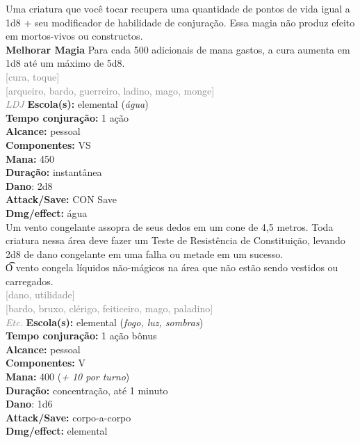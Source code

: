 \documentclass{RPG_Adventure}[2021/10/20]
\begin{document}
{\normalsize Uma criatura que você tocar recupera uma quantidade de pontos de vida igual a 1d8 + seu modificador de habilidade de conjuração. Essa magia não produz efeito em mortos-vivos ou constructos.\\\t \textbf{Melhorar Magia} Para cada 500 adicionais de mana gastos, a cura aumenta em 1d8 até um máximo de 5d8.\\}
{\scriptsize \textcolor{gray}{[cura, toque]\\}}
{\scriptsize \textcolor{gray}{[arqueiro, bardo, guerreiro, ladino, mago, monge]\\}}
{\tiny \textcolor{gray}{\textit{LDJ}}}
{\small \t \textbf{Escola(s):} elemental (\textit{água})\\\t \textbf{Tempo conjuração:} 1 ação\\\t \textbf{Alcance:} pessoal\\\t \textbf{Componentes:} VS\\\t \textbf{Mana:} 450\\\t \textbf{Duração:} instantânea\\\t \textbf{Dano}: 2d8\\\t \textbf{Attack/Save:} CON Save\\\t \textbf{Dmg/effect:} água\\}
{\normalsize Um vento congelante assopra de seus dedos em um cone de 4,5 metros. Toda criatura nessa área deve fazer um Teste de Resistência de Constituição, levando 2d8 de dano congelante em uma falha ou metade em um sucesso.\\\t O vento congela líquidos não-mágicos na área que não estão sendo vestidos ou carregados.\\}
{\scriptsize \textcolor{gray}{[dano, utilidade]\\}}
{\scriptsize \textcolor{gray}{[bardo, bruxo, clérigo, feiticeiro, mago, paladino]\\}}
{\tiny \textcolor{gray}{\textit{Etc.}}}
{\small \t \textbf{Escola(s):} elemental (\textit{fogo, luz, sombras})\\\t \textbf{Tempo conjuração:} 1 ação bônus\\\t \textbf{Alcance:} pessoal\\\t \textbf{Componentes:} V\\\t \textbf{Mana:} 400 (\textit{+ 10 por turno})\\\t \textbf{Duração:} concentração, até 1 minuto\\\t \textbf{Dano}: 1d6\\\t \textbf{Attack/Save:} corpo-a-corpo\\\t \textbf{Dmg/effect:} elemental\\}
\end{document}
